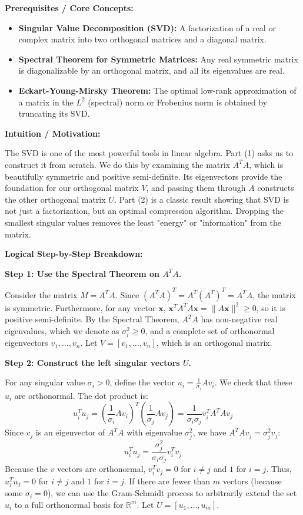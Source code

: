 \begin{solution}
\textbf{Prerequisites / Core Concepts:}
\begin{itemize}
    \item \textbf{Singular Value Decomposition (SVD):} A factorization of a real or complex matrix into two orthogonal matrices and a diagonal matrix.
    \item \textbf{Spectral Theorem for Symmetric Matrices:} Any real symmetric matrix is diagonalizable by an orthogonal matrix, and all its eigenvalues are real.
    \item \textbf{Eckart-Young-Mirsky Theorem:} The optimal low-rank approximation of a matrix in the $L^2$ (spectral) norm or Frobenius norm is obtained by truncating its SVD.
\end{itemize}

\textbf{Intuition / Motivation:}

The SVD is one of the most powerful tools in linear algebra. Part (1) asks us to construct it from scratch. We do this by examining the matrix $A^T A$, which is beautifully symmetric and positive semi-definite. Its eigenvectors provide the foundation for our orthogonal matrix $V$, and passing them through $A$ constructs the other orthogonal matrix $U$. Part (2) is a classic result showing that SVD is not just a factorization, but an optimal compression algorithm. Dropping the smallest singular values removes the least "energy" or "information" from the matrix.

\textbf{Logical Step-by-Step Breakdown:}

\textbf{Step 1: Use the Spectral Theorem on $A^T A$.}

Consider the matrix $M = A^T A$. Since $(A^T A)^T = A^T (A^T)^T = A^T A$, the matrix is symmetric. Furthermore, for any vector $\mathbf{x}$, $\mathbf{x}^T A^T A \mathbf{x} = \|A\mathbf{x}\|^2 \geq 0$, so it is positive semi-definite.
By the Spectral Theorem, $A^T A$ has non-negative real eigenvalues, which we denote as $\sigma_i^2 \geq 0$, and a complete set of orthonormal eigenvectors $v_1, \dots, v_n$. Let $V = [v_1, \dots, v_n]$, which is an orthogonal matrix.

\textbf{Step 2: Construct the left singular vectors $U$.}

For any singular value $\sigma_i > 0$, define the vector $u_i = \frac{1}{\sigma_i} A v_i$. 
We check that these $u_i$ are orthonormal. The dot product is:
\[ u_i^T u_j = \left( \frac{1}{\sigma_i} A v_i \right)^T \left( \frac{1}{\sigma_j} A v_j \right) = \frac{1}{\sigma_i \sigma_j} v_i^T A^T A v_j \]
Since $v_j$ is an eigenvector of $A^T A$ with eigenvalue $\sigma_j^2$, we have $A^T A v_j = \sigma_j^2 v_j$:
\[ u_i^T u_j = \frac{\sigma_j^2}{\sigma_i \sigma_j} v_i^T v_j \]
Because the $v$ vectors are orthonormal, $v_i^T v_j = 0$ for $i \neq j$ and $1$ for $i = j$. Thus, $u_i^T u_j = 0$ for $i \neq j$ and $1$ for $i=j$.
If there are fewer than $m$ vectors (because some $\sigma_i = 0$), we can use the Gram-Schmidt process to arbitrarily extend the set $u_i$ to a full orthonormal basis for $\mathbb{R}^m$. Let $U = [u_1, \dots, u_m]$.


\end{solution}
